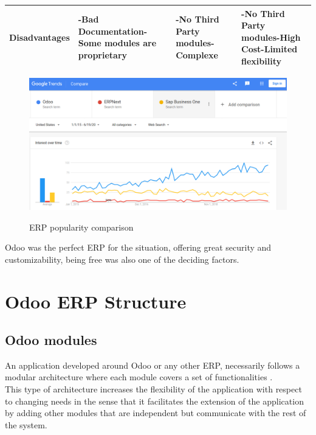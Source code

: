 \begin{table}[H]
\begin{tabular}{|p{3cm}|p{}|p{}|p{}|}
 \textbf{Disadvantages} & 
 \newline{}-Bad Documentation\newline{}-Some modules are proprietary
 & \newline{}-No Third Party modules\newline{}-Complexe
 & \newline{}-No Third Party modules\newline{}-High Cost\newline{}-Limited flexibility\\
\hline

\end{tabular}
\end{table}
        \begin{figure}[H]
         \begin{center}
         \includegraphics[scale=0.38]{img/framework-comparison.png}\\
         \caption{ERP popularity comparison}
         \end{center}
         \end{figure}


    
Odoo was the perfect ERP for the situation, offering great security and customizability, being free was also one of the deciding factors.
        
\section{Odoo ERP Structure}        
\subsection*{Odoo modules}
An application developed around Odoo or any other ERP, necessarily follows a modular architecture where each module covers a set of functionalities .\\
This type of architecture increases the flexibility of the application with respect to changing needs in the sense that it facilitates the extension of the application by adding other modules that are independent but communicate with the rest of the system.
